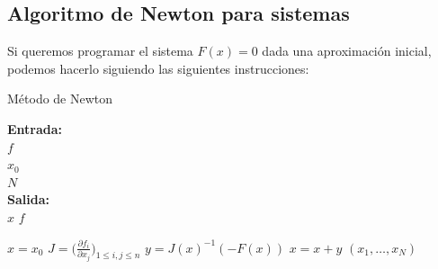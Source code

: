\subsection{Algoritmo de Newton para sistemas}

Si queremos programar el sistema $F(x) = 0$ dada una aproximación inicial, podemos hacerlo siguiendo las siguientes instrucciones: \\

\begin{algorithm}[H]
	\caption{Método de Newton}
	\textbf{Entrada: } \\
	\hspace*{\algorithmicindent} $f$  \\
	\hspace*{\algorithmicindent} $x_0$  \\
	\hspace*{\algorithmicindent} $N$  \\
	\textbf{Salida:} \\
	\hspace*{\algorithmicindent} $x$  $f$
	\begin{algorithmic}
		\Procedure {}{}
		\State $x = x_0$
		\State $J = \Big(\frac{\partial f_i}{\partial x_j}\Big)_{1 \leq i , j \leq n}$ 
		\State $y = J(x)^{-1} (-F(x))$
		\State $x = x + y$
		\State \Return $(x_1, \dots , x_N)$ 
		\EndFor
		\EndProcedure
	\end{algorithmic}
\end{algorithm}

